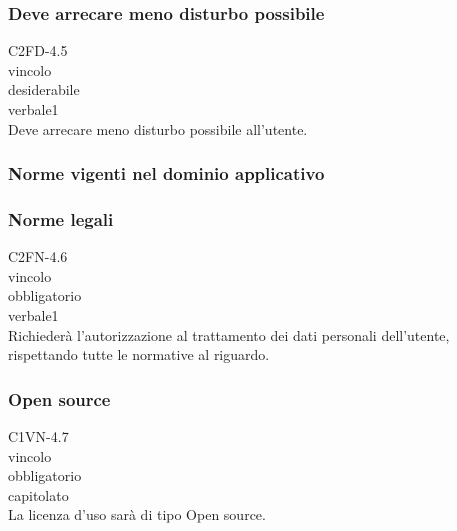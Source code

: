 \subsubsection*{Deve arrecare meno disturbo possibile}
 C2FD-4.5\\
 vincolo \\
 desiderabile \\
 verbale1 \\
Deve arrecare meno disturbo possibile all'utente.

\subsubsection{Norme vigenti nel dominio applicativo}
\subsubsection*{Norme legali}
 C2FN-4.6\\
 vincolo \\
 obbligatorio \\
 verbale1 \\
Richieder\`a l'autorizzazione al trattamento dei dati personali dell'utente,
rispettando tutte le normative al riguardo.

\subsubsection*{Open source}
 C1VN-4.7 \\
 vincolo \\
 obbligatorio \\
 capitolato \\
La licenza d'uso sar\`a di tipo Open source.


